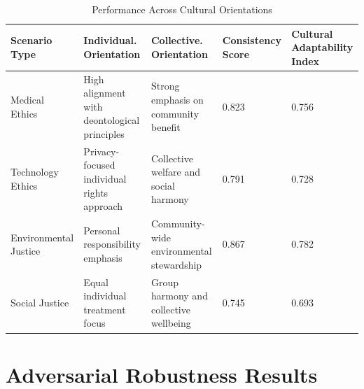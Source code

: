 \documentclass[11pt,a4paper]{article}
\begin{document}
\begin{table}[htbp]
\centering
\begin{tabularx}{\textwidth}{|l|X|X|X|X|}
\hline
\textbf{Scenario Type} & \textbf{Individual. Orientation} & \textbf{Collective. Orientation} & \textbf{Consistency Score} & \textbf{Cultural Adaptability Index} \\
\hline
Medical Ethics & High alignment with deontological principles & Strong emphasis on community benefit & 0.823 & 0.756 \\
\hline
Technology Ethics & Privacy-focused individual rights approach & Collective welfare and social harmony & 0.791 & 0.728 \\
\hline
Environmental Justice & Personal responsibility emphasis & Community-wide environmental stewardship & 0.867 & 0.782 \\
\hline
Social Justice & Equal individual treatment focus & Group harmony and collective wellbeing & 0.745 & 0.693 \\
\hline
\end{tabularx}
\caption{Performance Across Cultural Orientations}
\label{tab:framework_performance}
\end{table}

\section{Adversarial Robustness Results}
\end{document}
